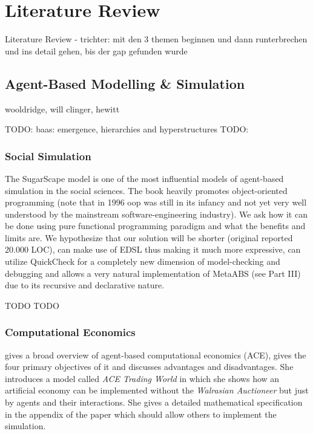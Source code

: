 \section{Literature Review}
Literature Review
- trichter: mit den 3 themen beginnen und dann runterbrechen und ins detail gehen, bis der gap gefunden wurde

\subsection{Agent-Based Modelling \& Simulation}
 wooldridge,  will clinger, hewitt

TODO: baas: emergence, hierarchies and hyperstructures
TODO: \cite{baas_emergence_1997}

\subsubsection{Social Simulation}
The SugarScape model \cite{epstein_growing_1996} is one of the most influential models of agent-based simulation in the social sciences. The book heavily promotes object-oriented programming (note that in 1996 oop was still in its infancy and not yet very well understood by the mainstream software-engineering industry). We ask how it can be done using pure functional programming paradigm and what the benefits and limits are. We hypothesize that our solution will be shorter (original reported 20.000 LOC), can make use of EDSL thus making it much more expressive, can utilize QuickCheck for a completely new dimension of model-checking and debugging and allows a very natural implementation of MetaABS (see Part III) due to its recursive and declarative nature.

TODO \cite{huberman_evolutionary_1993} 
TODO \cite{nowak_evolutionary_1992}
\subsubsection{Computational Economics}
\cite{tesfatsion_agent-based_2006} gives a broad overview of agent-based computational economics (ACE), gives the four primary objectives of it and discusses advantages and disadvantages. She introduces a model called \textit{ACE Trading World} in which she shows how an artificial economy can be implemented without the \textit{Walrasian Auctioneer} but just by agents and their interactions. She gives a detailed mathematical specification in the appendix of the paper which should allow others to implement the simulation.

